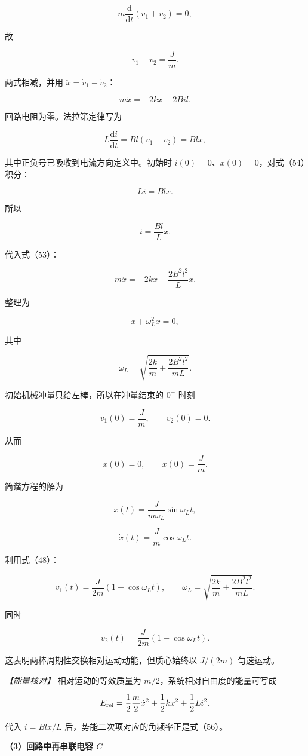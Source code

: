 \documentclass[12pt,a4paper,UTF8]{ctexart}
\begin{document}
\[m\frac{\mathrm d}{\mathrm dt}(v_1+v_2)=0,\]

故

\[v_1+v_2=\frac Jm. \tag{52}\]

两式相减，并用 \(\ddot x=\dot v_1-\dot v_2\)：

\[m\ddot x=-2kx-2Bil. \tag{53}\]

回路电阻为零。法拉第定律写为

\[L\frac{\mathrm di}{\mathrm dt}=Bl(v_1-v_2)=Bl\dot x, \tag{54}\]

其中正负号已吸收到电流方向定义中。初始时
\(i(0)=0\)、\(x(0)=0\)，对式（54）积分：

\[Li=Blx.\]

所以

\[i=\frac{Bl}{L}x. \tag{55}\]

代入式（53）：

\[m\ddot x=-2kx-\frac{2B^2l^2}{L}x.\]

整理为

\[\ddot x+\omega_L^2x=0,\]

其中

\[\omega_L=\sqrt{\frac{2k}{m}+\frac{2B^2l^2}{mL}}. \tag{56}\]

初始机械冲量只给左棒，所以在冲量结束的 \(0^+\) 时刻

\[v_1(0)=\frac Jm,\qquad v_2(0)=0.\]

从而

\[x(0)=0,\qquad \dot x(0)=\frac Jm.\]

简谐方程的解为

\[x(t)=\frac{J}{m\omega_L}\sin\omega_Lt,\]

\[\dot x(t)=\frac Jm\cos\omega_Lt. \tag{57}\]

利用式（48）：

\[\boxed{
v_1(t)=\frac{J}{2m}\left(1+\cos\omega_Lt\right),
\qquad
\omega_L=\sqrt{\frac{2k}{m}+\frac{2B^2l^2}{mL}}
}. \tag{58}\]

同时

\[v_2(t)=\frac{J}{2m}\left(1-\cos\omega_Lt\right).\]

这表明两棒周期性交换相对运动动能，但质心始终以 \(J/(2m)\) 匀速运动。

\emph{【能量核对】} 相对运动的等效质量为
\(m/2\)，系统相对自由度的能量可写成

\[E_{\rm rel}=\frac12\frac m2\dot x^2+\frac12kx^2+\frac12Li^2.\]

代入 \(i=Blx/L\) 后，势能二次项对应的角频率正是式（56）。

\textbf{（3）回路中再串联电容 \(C\)}
\end{document}

